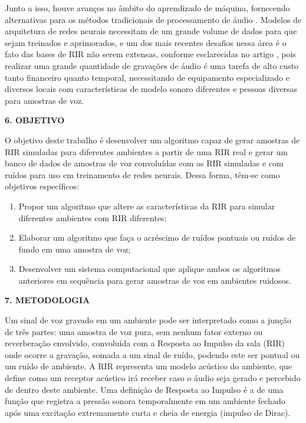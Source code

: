\documentclass[a4paper,12pt,oneside,openany]{report}
\begin{document}
Junto a isso, houve avanços no âmbito do aprendizado de máquina, fornecendo alternativas para os métodos tradicionais
de processamento de áudio \cite{ML_Speech_Rec}.
Modelos de arquitetura de redes neurais necessitam de um grande volume de dados para que sejam treinados e aprimorados, e um dos mais recentes
desafios nessa área é o fato das bases de RIR não serem extensas, conforme esclarecidas no artigo \cite{Estimation_RT_DRR},
pois realizar uma grande quantidade de gravações de áudio é uma tarefa de alto custo tanto financeiro quanto temporal, necessitando de equipamento especializado
e diversos locais com características de modelo sonoro diferentes e pessoas diversas para amostras de voz.


\vspace{0.4cm}
\textbf{6. OBJETIVO}

O objetivo deste trabalho é desenvolver um algoritmo capaz de gerar amostras de RIR simuladas para diferentes ambientes a partir de uma RIR real e
gerar um banco de dados de amostras de voz convoluídas com as RIR simuladas e com ruídos para uso em treinamento de redes neurais.
Dessa forma, têm-se como objetivos específicos:

\begin{enumerate}
      \item Propor um algoritmo que altere as características da RIR para simular diferentes ambientes com RIR diferentes;
      \item Elaborar um algoritmo que faça o acréscimo de ruídos pontuais ou ruídos de fundo em uma amostra de voz;
      \item Desenvolver um sistema computacional que aplique ambos os algoritmos anteriores em sequência para gerar
      amostras de voz em ambientes ruidosos.
\end{enumerate}

\vspace{0.4cm}
\textbf{7. METODOLOGIA}

Um sinal de voz gravado em um ambiente pode ser interpretado como a junção de três partes: uma amostra de voz pura, sem nenhum fator externo
ou reverberação envolvido, convoluída com a Resposta ao Impulso da sala (RIR) onde ocorre a gravação, somada a um sinal de ruído, podendo este 
ser pontual ou um ruído de ambiente. A RIR representa um modelo acústico do ambiente, que define como um receptor acústico irá receber caso o áudio
seja gerado e percebido de dentro deste ambiente. Uma definição de Resposta ao Impulso é a de uma função que registra a pressão sonora temporalmente
em um ambiente fechado após uma excitação extremamente curta e cheia de energia (impulso de Dirac).
\end{document}
